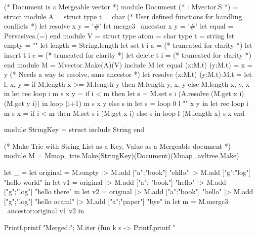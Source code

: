 \documentclass{article}
\begin{document}
\begin{longlisting}
(* Document is a Mergeable vector *)
module Document (* : Mvector.S *) = struct
  module A = struct
    type t = char
    (* User defined functions for handling conflicts *)
    let resolve x y = '#'
    let merge3 ~ancestor x y = '#'
    let equal = Pervasives.(=)
  end
  module V = struct
    type atom = char
    type t = string
    let empty = ""
    let length = String.length
    let set t i a =
      (* truncated for clarity *)
    let insert t i c =
      (* truncated for clarity *)
    let delete t i =
      (* truncated for clarity *)
  end
  module M = Mvector.Make(A)(V)
  include M
  let equal (x:M.t) (y:M.t) = x = y
  (* Needs a way to resolve, sans ancestor *)
  let resolve (x:M.t) (y:M.t):M.t =
    let l, x, y = 
      if M.length x >= M.length y then M.length y, x, y 
      else M.length x, y, x in
    let rec loop i m s x y =
      if i < m then
        let s = M.set s i (A.resolve (M.get x i) (M.get y i)) in
        loop (i+1) m s x y
      else s in
    let s = loop 0 l "" x y in
    let rec loop i m s x =
      if i < m then M.set s i (M.get x i)
      else s in 
    loop l (M.length x) s x
end

module StringKey = struct
  include String
end

(* Make Trie with String List as a Key, Value as a Mergeable document *)
module M = Mmap_trie.Make(StringKey)(Document)(Mmap_avltree.Make)

let _ =
  let original = M.empty |> M.add ["a";"book"] "ehllo" |> M.add ["g";"log"] "hello world" in
  let v1 = original |> M.add ["a"; "book"] "hello" |> M.add ["g";"log"] "hello there" in
  let v2 = original |> M.add ["a";"book"] "hello" |> 
            M.add ["g";"log"] "hello ocaml" |> M.add ["a";"paper"] "bye" in
  let m = M.merge3 ~ancestor:original v1 v2 in

  Printf.printf "Merged:\n";
  M.iter (fun k s -> Printf.printf "%
\end{longlisting}

\newpage
\end{document}
